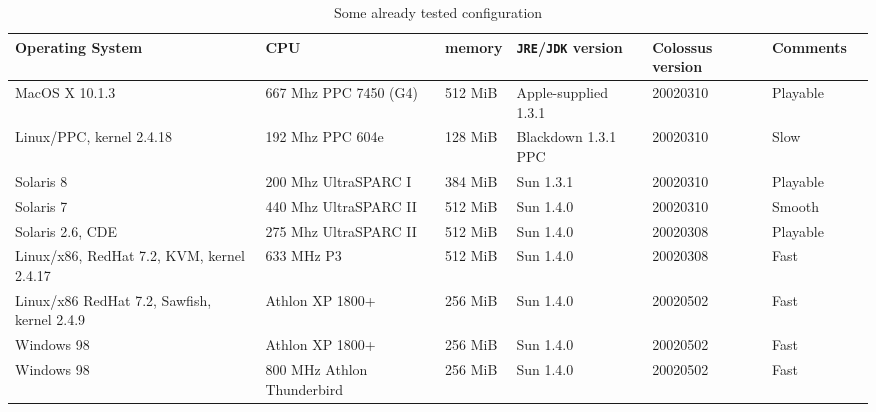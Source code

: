 \documentclass{article}
\begin{document}
\begin{table}
\begin{tabular}{|p{2.5cm}|p{2.5cm}|p{1.8cm}|p{2.5cm}|p{2.5cm}|p{1.8cm}|p{1.8cm}|}

\hline

\textbf{Operating System} & \textbf{CPU} & \textbf{memory} &  \textbf{\texttt{JRE}/\texttt{JDK} version} & \textbf{Colossus version} & \textbf{Comments}\\

\hline

MacOS X 10.1.3 & 667 Mhz PPC 7450 (G4) & 512 MiB & Apple-supplied 1.3.1 & 20020310 & Playable \\

\hline

Linux/PPC, kernel 2.4.18 & 192 Mhz PPC 604e & 128 MiB & Blackdown 1.3.1 PPC & 20020310 & Slow \\

\hline

Solaris 8 & 200 Mhz UltraSPARC I & 384 MiB & Sun 1.3.1 & 20020310 & Playable \\

\hline

Solaris 7 & 440 Mhz UltraSPARC II & 512 MiB & Sun 1.4.0 & 20020310 & Smooth \\

\hline

Solaris 2.6, CDE & 275 Mhz UltraSPARC II & 512 MiB & Sun 1.4.0 & 20020308 & Playable \\

\hline

Linux/x86, RedHat 7.2, KVM, kernel 2.4.17 & 633 MHz P3 & 512 MiB & Sun 1.4.0 & 20020308 & Fast \\

\hline

Linux/x86 RedHat 7.2, Sawfish, kernel 2.4.9 & Athlon XP 1800+ & 256 MiB & Sun 1.4.0 & 20020502 & Fast \\

\hline

Windows 98 & Athlon XP 1800+ & 256 MiB & Sun 1.4.0 & 20020502 & Fast \\

\hline

Windows 98 & 800 MHz Athlon Thunderbird & 256 MiB & Sun 1.4.0 & 20020502 & Fast \\

\hline

\end{tabular}
\caption{Some already tested configuration}
\label{TESTED}
\end{table}



\end{document}
